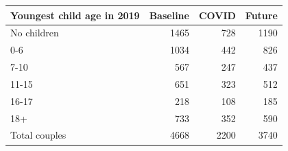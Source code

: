 
\begin{tabular}{lrrr}
\toprule
Youngest child age in 2019 & Baseline & COVID & Future\\
\midrule
No children & 1465 & 728 & 1190\\
0-6 & 1034 & 442 & 826\\
7-10 & 567 & 247 & 437\\
11-15 & 651 & 323 & 512\\
16-17 & 218 & 108 & 185\\
18+ & 733 & 352 & 590\\
Total couples & 4668 & 2200 & 3740\\
\bottomrule
\end{tabular}
